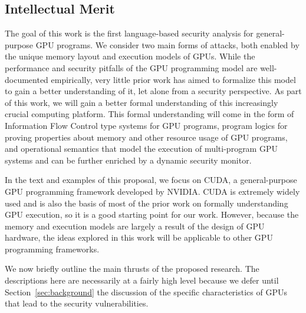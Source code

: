 \subsection{Intellectual Merit}
The goal of this work is the first language-based security analysis for general-purpose GPU programs.
%
We consider two main forms of attacks, both enabled by the unique memory
layout and execution models of GPUs.
%
While the performance and security pitfalls of the GPU programming model are well-documented empirically, very little prior work has aimed to formalize this model to gain a better understanding of it, let alone from a security perspective.
%
As part of this work, we will gain a better formal understanding of this increasingly crucial computing platform.
%
This formal understanding will come in the form of Information Flow Control type systems for GPU programs, program logics for proving properties about memory and other resource usage of GPU programs, and operational semantics that model the execution of multi-program GPU systems and can be further enriched by a dynamic security monitor.

In the text and examples of this proposal, we focus on CUDA, a general-purpose GPU programming framework developed by NVIDIA.
%
CUDA is extremely widely used and is also the basis of most of the prior work on formally understanding GPU execution, so it is a good starting point for our work.
%
However, because the memory and execution models are largely a result of the design of GPU hardware, the ideas explored in this work will be applicable to other GPU programming frameworks.

We now briefly outline the main thrusts of the proposed research.
%
The descriptions here are necessarily at a fairly high level because we defer until Section~\ref{sec:background} the discussion of the specific characteristics of GPUs that lead to the security vulnerabilities.

